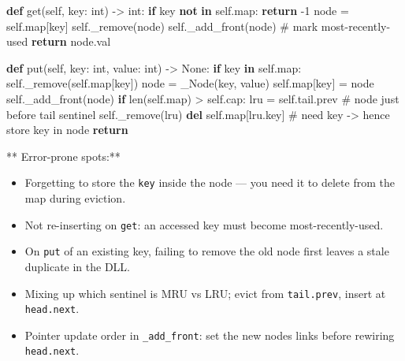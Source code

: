 \documentclass[11pt]{article}
\providecommand{\tightlist}{\setlength{\itemsep}{1pt}\setlength{\parskip}{0pt}}
\newenvironment{Shaded}{\begin{snugshade}}{\end{snugshade}}
\newcommand{\BuiltInTok}[1]{\textcolor[rgb]{0.50,0.55,0.55}{#1}}
\newcommand{\CommentTok}[1]{\textcolor[rgb]{0.48,0.49,0.49}{#1}}
\newcommand{\ControlFlowTok}[1]{\textcolor[rgb]{0.99,0.74,0.29}{\textbf{#1}}}
\newcommand{\DecValTok}[1]{\textcolor[rgb]{0.96,0.45,0.00}{#1}}
\newcommand{\KeywordTok}[1]{\textcolor[rgb]{0.81,0.81,0.76}{\textbf{#1}}}
\newcommand{\NormalTok}[1]{\textcolor[rgb]{0.81,0.81,0.76}{#1}}
\newcommand{\OperatorTok}[1]{\textcolor[rgb]{0.81,0.81,0.76}{#1}}
\newcommand{\VariableTok}[1]{\textcolor[rgb]{0.15,0.68,0.68}{#1}}
\begin{document}
\begin{Shaded}
\begin{Highlighting}[]
    \KeywordTok{def}\NormalTok{ get(}\VariableTok{self}\NormalTok{, key: }\BuiltInTok{int}\NormalTok{) }\OperatorTok{{-}\textgreater{}} \BuiltInTok{int}\NormalTok{:}
        \ControlFlowTok{if}\NormalTok{ key }\KeywordTok{not} \KeywordTok{in} \VariableTok{self}\NormalTok{.}\BuiltInTok{map}\NormalTok{:}
            \ControlFlowTok{return} \OperatorTok{{-}}\DecValTok{1}
\NormalTok{        node }\OperatorTok{=} \VariableTok{self}\NormalTok{.}\BuiltInTok{map}\NormalTok{[key]}
        \VariableTok{self}\NormalTok{.\_remove(node)}
        \VariableTok{self}\NormalTok{.\_add\_front(node)               }\CommentTok{\# mark most{-}recently{-}used}
        \ControlFlowTok{return}\NormalTok{ node.val}

    \KeywordTok{def}\NormalTok{ put(}\VariableTok{self}\NormalTok{, key: }\BuiltInTok{int}\NormalTok{, value: }\BuiltInTok{int}\NormalTok{) }\OperatorTok{{-}\textgreater{}} \VariableTok{None}\NormalTok{:}
        \ControlFlowTok{if}\NormalTok{ key }\KeywordTok{in} \VariableTok{self}\NormalTok{.}\BuiltInTok{map}\NormalTok{:}
            \VariableTok{self}\NormalTok{.\_remove(}\VariableTok{self}\NormalTok{.}\BuiltInTok{map}\NormalTok{[key])}
\NormalTok{        node }\OperatorTok{=}\NormalTok{ \_Node(key, value)}
        \VariableTok{self}\NormalTok{.}\BuiltInTok{map}\NormalTok{[key] }\OperatorTok{=}\NormalTok{ node}
        \VariableTok{self}\NormalTok{.\_add\_front(node)}
        \ControlFlowTok{if} \BuiltInTok{len}\NormalTok{(}\VariableTok{self}\NormalTok{.}\BuiltInTok{map}\NormalTok{) }\OperatorTok{\textgreater{}} \VariableTok{self}\NormalTok{.cap:}
\NormalTok{            lru }\OperatorTok{=} \VariableTok{self}\NormalTok{.tail.prev            }\CommentTok{\# node just before tail sentinel}
            \VariableTok{self}\NormalTok{.\_remove(lru)}
            \KeywordTok{del} \VariableTok{self}\NormalTok{.}\BuiltInTok{map}\NormalTok{[lru.key]           }\CommentTok{\# need key {-}\textgreater{} hence store key in node}
        \ControlFlowTok{return}
\end{Highlighting}
\end{Shaded}

** Error-prone spots:**

\begin{itemize}
\tightlist
\item
  Forgetting to store the \texttt{key} inside the node --- you need it to delete from the map during eviction.
\item
  Not re-inserting on \texttt{get}: an accessed key must become most-recently-used.
\item
  On \texttt{put} of an existing key, failing to remove the old node first leaves a stale duplicate in the DLL.
\item
  Mixing up which sentinel is MRU vs LRU; evict from \texttt{tail.prev}, insert at \texttt{head.next}.
\item
  Pointer update order in \texttt{\_add\_front}: set the new node\textquotesingle s links before rewiring \texttt{head.next}.
\end{itemize}
\end{document}

